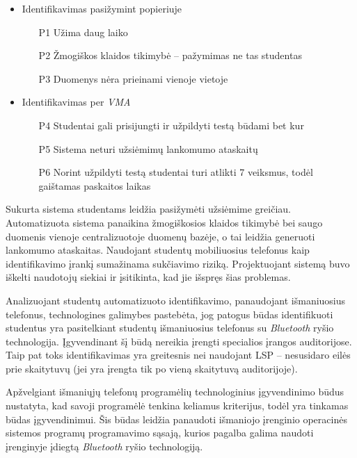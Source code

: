 \documentclass{VUMIFPSbakalaurinis}
\begin{document}
\begin{itemize}
    \item Identifikavimas pasižymint popieriuje
    \begin{itemize}
        \item[P1] Užima daug laiko
        \item[P2] Žmogiškos klaidos tikimybė – pažymimas ne tas studentas
        \item[P3] Duomenys nėra prieinami vienoje vietoje
    \end{itemize}
    \item Identifikavimas per \textit{VMA}
    \begin{itemize}
        \item[P4] Studentai gali prisijungti ir užpildyti testą būdami bet kur
        \item[P5] Sistema neturi užsiėmimų lankomumo ataskaitų
        \item[P6] Norint užpildyti testą studentai turi atlikti 7 veiksmus, todėl gaištamas paskaitos laikas
    \end{itemize}
\end{itemize}

Sukurta sistema studentams leidžia pasižymėti užsiėmime greičiau. Automatizuota sistema panaikina žmogiškosios klaidos tikimybė bei saugo duomenis vienoje centralizuotoje duomenų bazėje, o tai leidžia generuoti lankomumo ataskaitas. Naudojant studentų mobiliuosius telefonus kaip identifikavimo įrankį sumažinama sukčiavimo riziką. Projektuojant sistemą buvo iškelti naudotojų siekiai ir įsitikinta, kad jie išspręs šias problemas.

Analizuojant studentų automatizuoto identifikavimo, panaudojant išmaniuosius telefonus, technologines galimybes pastebėta, jog patogus būdas identifikuoti studentus yra pasitelkiant studentų išmaniuosius telefonus su \textit{Bluetooth} ryšio technologija. Įgyvendinant šį būdą nereikia įrengti specialios įrangos auditorijose. Taip pat toks identifikavimas yra greitesnis nei naudojant LSP – nesusidaro eilės prie skaitytuvų (jei yra įrengta tik po vieną skaitytuvą auditorijoje).

Apžvelgiant išmaniųjų telefonų programėlių technologinius įgyvendinimo būdus nustatyta, kad savoji programėlė tenkina keliamus kriterijus, todėl yra tinkamas būdas įgyvendinimui. Šis būdas leidžia panaudoti išmaniojo įrenginio operacinės sistemos programų programavimo sąsają, kurios pagalba galima naudoti įrenginyje įdiegtą \textit{Bluetooth} ryšio technologiją.
\end{document}
